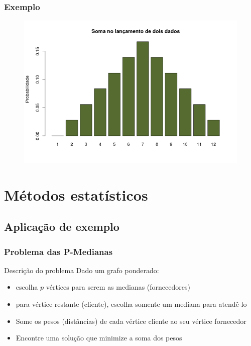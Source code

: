 \documentclass[xcolor=dvipsnames]{beamer}
\begin{document}
\begin{frame}%
\frametitle{Exemplo}
\begin{figure}
\centering
\includegraphics[scale=0.55]{img/lancamento_2_dados.png}
\end{figure}
\end{frame}%


\section{Métodos estatísticos}

\subsection{Aplicação de exemplo}

\begin{frame}%
\frametitle{Problema das P-Medianas}

\begin{block}{Descrição do problema}
Dado um grafo ponderado:
\begin{itemize}
\item escolha $p$ vértices para serem as medianas (fornecedores)
\item para vértice restante (cliente), escolha somente um mediana para atendê-lo
\item Some os pesos (distâncias) de cada vértice cliente ao seu vértice fornecedor
\item Encontre uma solução que minimize a soma dos pesos
\end{itemize}
\end{block}
\end{frame}%
\end{document}
